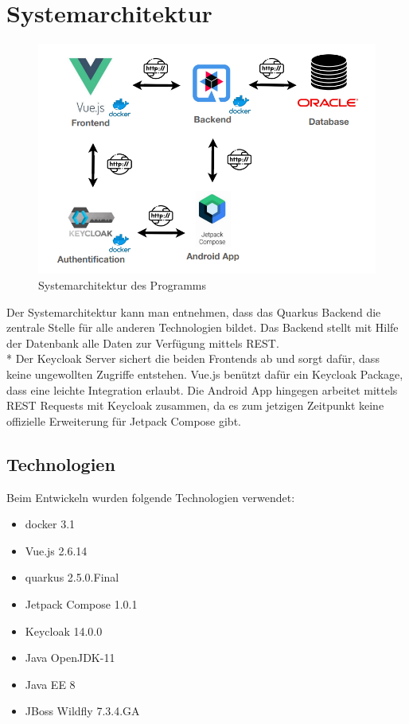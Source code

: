 \section {Systemarchitektur}
\author{Benjamin Besic}

\begin{figure}[htp]
    \centering
    \author{David Ignjatovic}
    \includegraphics[scale=0.7]{pics/final-sys-arc.PNG}
    \caption{Systemarchitektur des Programms}
    \label{fig:impl:SysArc}
\end{figure}

Der Systemarchitektur kann man entnehmen, dass das Quarkus Backend die zentrale Stelle für alle anderen Technologien bildet.
Das Backend stellt mit Hilfe der Datenbank alle Daten zur Verfügung mittels REST. \\*
Der Keycloak Server sichert die beiden Frontends ab und sorgt dafür, dass keine ungewollten Zugriffe entstehen.
Vue.js benützt dafür ein Keycloak Package, dass eine leichte Integration erlaubt. Die Android App hingegen arbeitet mittels REST Requests mit Keycloak zusammen,
da es zum jetzigen Zeitpunkt keine offizielle Erweiterung für Jetpack Compose gibt.

\subsection{Technologien}

Beim Entwickeln wurden folgende Technologien verwendet:
\begin{itemize}
    \item docker 3.1
    \item Vue.js 2.6.14
    \item quarkus 2.5.0.Final
    \item Jetpack Compose 1.0.1
    \item Keycloak 14.0.0
    \item Java OpenJDK-11
    \item Java EE 8
    \item JBoss Wildfly 7.3.4.GA
\end{itemize}

